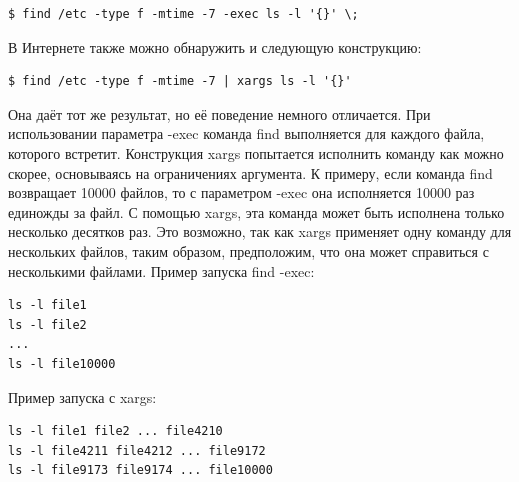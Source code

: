 \documentclass[10pt]{book}
\begin{document}
\vspace{3mm}
\begin{tcolorbox}
\begin{lstlisting}
$ find /etc -type f -mtime -7 -exec ls -l '{}' \;
\end{lstlisting}
\end{tcolorbox}

В Интернете также можно обнаружить и следующую конструкцию:

\vspace{3mm}
\begin{tcolorbox}
\begin{lstlisting}
$ find /etc -type f -mtime -7 | xargs ls -l '{}'
\end{lstlisting}
\end{tcolorbox}

Она даёт тот же результат, но её поведение немного отличается.
При использовании параметра -exec команда find выполняется для каждого файла, которого встретит. Конструкция xargs попытается исполнить команду как можно скорее, основываясь на ограничениях аргумента.
К примеру, если команда find возвращает 10000 файлов, то с параметром -exec она исполняется 10000 раз единожды за файл. С помощью xargs, эта команда может быть исполнена только несколько десятков раз. Это возможно, так как xargs применяет одну команду для нескольких файлов, таким образом, предположим, что она может справиться с несколькими файлами.
Пример запуска find -exec: 

\vspace{3mm}
\begin{tcolorbox}
\begin{lstlisting}
ls -l file1
ls -l file2
...
ls -l file10000
\end{lstlisting}
\end{tcolorbox}

Пример запуска с xargs:

\vspace{3mm}
\begin{tcolorbox}
\begin{lstlisting}
ls -l file1 file2 ... file4210
ls -l file4211 file4212 ... file9172
ls -l file9173 file9174 ... file10000
\end{lstlisting}
\end{tcolorbox}

\newpage
\end{document}
